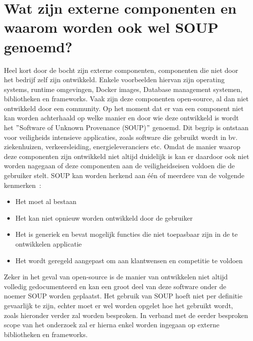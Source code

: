 \section{Wat zijn externe componenten en waarom worden ook wel SOUP genoemd?}\label{sec:watisSOUP}
Heel kort door de bocht zijn externe componenten, componenten die niet door het bedrijf zelf zijn ontwikkeld. Enkele voorbeelden hiervan zijn operating systems, runtime omgevingen, Docker images, Database management systemen, bibliotheken en frameworks. Vaak zijn deze componenten open-source, al dan niet ontwikkeld door een community.
Op het moment dat er van een component niet kan worden achterhaald op welke manier en door wie deze ontwikkeld is wordt het $"$Software of Unknown Provenance (SOUP)$"$ genoemd. Dit begrip is ontstaan voor veiligheids intensieve applicaties, zoals software die gebruikt wordt in bv. ziekenhuizen, verkeersleiding, energieleveranciers etc.
Omdat de manier waarop deze componenten zijn ontwikkeld niet altijd duidelijk is kan er daardoor ook niet worden nagegaan of deze componenten aan de veiligheidseisen voldoen die de gebruiker stelt. SOUP kan worden herkend aan één of meerdere van de volgende kenmerken~\citep{Bischop:2001}:
\begin{itemize}
    \item Het moet al bestaan
    \item Het kan niet opnieuw worden ontwikkeld door de gebruiker
    \item Het is generiek en bevat mogelijk functies die niet toepasbaar zijn in de te ontwikkelen applicatie
    \item Het wordt geregeld aangepast om aan klantwensen en competitie te voldoen
\end{itemize}

Zeker in het geval van open-source is de manier van ontwikkelen niet altijd volledig gedocumenteerd en kan een groot deel van deze software onder de noemer SOUP worden geplaatst. Het gebruik van SOUP hoeft niet per definitie gevaarlijk te zijn, echter moet er wel worden opgelet hoe het gebruikt wordt, zoals hieronder verder zal worden besproken. In verband met de eerder besproken scope van het onderzoek zal er hierna enkel worden ingegaan op externe bibliotheken en frameworks.

